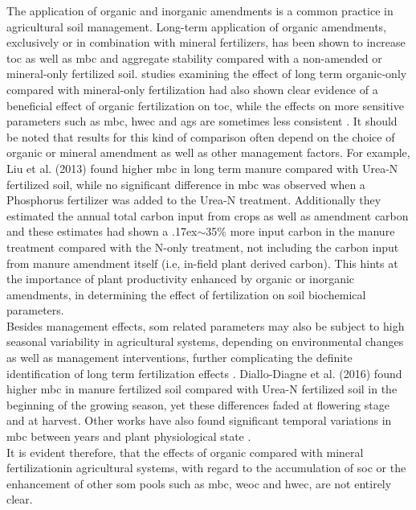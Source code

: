  		The application of organic and inorganic amendments is a common practice in agricultural soil management. Long-term application of organic amendments, exclusively or in combination with mineral fertilizers, has been shown to increase \gls{toc} \citep{heinze2010, yang2012} as well as \gls{mbc} \citep{luo2015, marschner2003a}and aggregate stability\citep{ huang2010, yu2012} compared with a non-amended or mineral-only fertilized soil.
 		studies examining the effect of long term organic-only compared with mineral-only fertilization had  also shown clear evidence of a beneficial effect of organic fertilization on \gls{toc}\citep{santos2012, luo2015}, while the effects on more sensitive parameters such as \gls{mbc}, \gls{hwec} and \gls{ags} are sometimes less consistent \citep{albiach2001, mahmood1997}. It should be noted that results for this kind of comparison often depend on the choice of organic or mineral amendment as well as other management factors.    
 		For example, Liu et al. (2013) found  higher \gls{mbc} in long term manure compared with Urea-N fertilized soil, while no significant difference in \gls{mbc} was observed when a Phosphorus fertilizer was added to the Urea-N treatment. Additionally they estimated the annual total carbon input from crops as well as amendment carbon and these estimates had shown a {\raise.17ex\hbox{$\scriptstyle\mathtt{\sim}$}}35\% more input carbon in the manure treatment compared with the N-only treatment, not including the carbon input from manure amendment itself (i.e, in-field plant derived carbon). This hints at the importance  of plant productivity enhanced by organic or inorganic amendments, in determining the  effect of fertilization on soil biochemical parameters.\\
 		Besides management effects, \gls{som}  related parameters may also be subject to high seasonal variability in agricultural systems, depending on environmental changes as well as management interventions, further complicating the definite identification of long term fertilization effects .
 		Diallo-Diagne et al. (2016) found higher \gls{mbc} in manure fertilized soil compared with Urea-N fertilized soil in the beginning of the growing season, yet these differences faded at flowering stage and at harvest. Other works have also found significant temporal variations in \gls{mbc} between years \citep{kaiser1995} and plant physiological state \citep{jat2020}.\\
		It is evident therefore, that the effects of organic compared with mineral fertilizationin agricultural systems, with regard to the accumulation of \gls{soc} or the enhancement of other \gls{som} pools such as \gls{mbc}, \gls{weoc} and \gls{hwec}, are not entirely clear.

